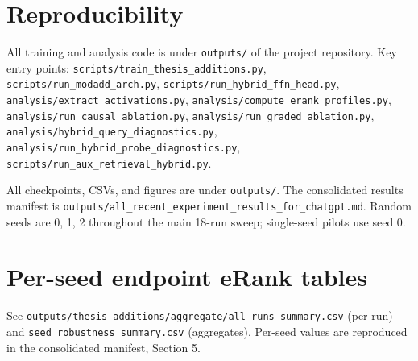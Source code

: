 \documentclass{article}
\begin{document}
\appendix

\section{Reproducibility}

All training and analysis code is under \texttt{outputs/} of the project repository. Key entry points: \texttt{scripts/train\_thesis\_additions.py}, \texttt{scripts/run\_modadd\_arch.py}, \texttt{scripts/run\_hybrid\_ffn\_head.py}, \texttt{analysis/extract\_activations.py}, \texttt{analysis/compute\_erank\_profiles.py}, \texttt{analysis/run\_causal\_ablation.py}, \texttt{analysis/run\_graded\_ablation.py}, \texttt{analysis/hybrid\_query\_diagnostics.py}, \texttt{analysis/run\_hybrid\_probe\_diagnostics.py}, \texttt{scripts/run\_aux\_retrieval\_hybrid.py}.

All checkpoints, CSVs, and figures are under \texttt{outputs/}. The consolidated results manifest is \texttt{outputs/all\_recent\_experiment\_results\_for\_chatgpt.md}. Random seeds are 0, 1, 2 throughout the main 18-run sweep; single-seed pilots use seed 0.

\section{Per-seed endpoint eRank tables}

See \texttt{outputs/thesis\_additions/aggregate/all\_runs\_summary.csv} (per-run) and \texttt{seed\_robustness\_summary.csv} (aggregates). Per-seed values are reproduced in the consolidated manifest, Section 5.
\end{document}
